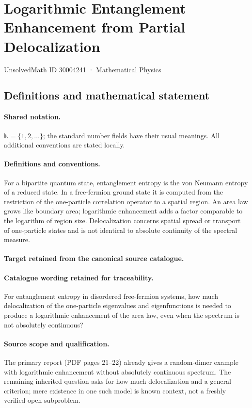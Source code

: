 \documentclass[11pt]{article}
\begin{document}
\setcounter{section}{30004240}
\section{Logarithmic Entanglement Enhancement from Partial Delocalization}\label{30004241}
{\small UnsolvedMath ID 30004241 · Mathematical Physics}
\subsection{Definitions and mathematical statement}

\paragraph{Shared notation.}$\mathbb N=\{1,2,\ldots\}$; the standard number fields have their usual meanings. All additional conventions are stated locally.


\paragraph{Definitions and conventions.}
For a bipartite quantum state, entanglement entropy is the von Neumann entropy of a reduced state. In a free-fermion ground state it is computed from the restriction of the one-particle correlation operator to a spatial region. An area law grows like boundary area; logarithmic enhancement adds a factor comparable to the logarithm of region size. Delocalization concerns spatial spread or transport of one-particle states and is not identical to absolute continuity of the spectral measure.

\paragraph{Target retained from the canonical source catalogue.}
\paragraph{Catalogue wording retained for traceability.}
For entanglement entropy in disordered free-fermion systems, how much delocalization of the one-particle eigenvalues and eigenfunctions is needed to produce a logarithmic enhancement of the area law, even when the spectrum is not absolutely continuous?

\paragraph{Source scope and qualification.}
The primary report (PDF pages 21--22) already gives a random-dimer example with logarithmic enhancement without absolutely continuous spectrum. The remaining inherited question asks for how much delocalization and a general criterion; mere existence in one such model is known context, not a freshly verified open subproblem.
\end{document}
